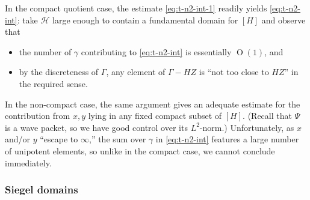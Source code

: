 \documentclass[reqno]{amsart}
\def\O{\operatorname{O}}
\theoremstyle{plain} \newtheorem{theorem} {Theorem}
\theoremstyle{definition} \newtheorem{definition} [theorem] {Definition}
\theoremstyle{itplain} %
\numberwithin{equation}{section}
\numberwithin{theorem}{section}
\begin{document}
In the compact quotient case, the estimate \eqref{eq:t-n2-int-1} readily yields \eqref{eq:t-n2-int}: take $\mathcal{H}$ large enough to contain a fundamental domain for $[H]$ and observe that
\begin{itemize}
\item  the number of $\gamma$ contributing to \eqref{eq:t-n2-int} is essentially $\O(1)$, and
\item by the discreteness of $\Gamma$, any element of $\Gamma - H Z$ is ``not too close to $H Z$'' in the required sense.
\end{itemize}

In the non-compact case, the same argument gives an adequate estimate for the contribution from $x, y$ lying in any fixed compact subset of $[H]$.  (Recall that $\Psi$ is a wave packet, so we have good control over its $L^2$-norm.)  Unfortunately, as $x$ and/or $y$ ``escape to $\infty$,'' the sum over $\gamma$ in \eqref{eq:t-n2-int} features a large number of unipotent elements, so unlike in the compact case, we cannot conclude immediately.

\subsubsection{Siegel domains}
\end{document}
